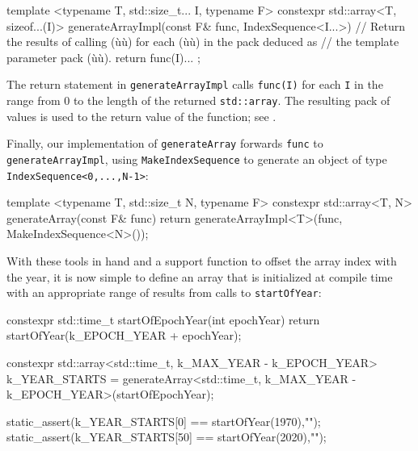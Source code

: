 \begin{emcppslisting}[emcppsbatch=e14]
template <typename T, std::size_t... I, typename F>
constexpr std::array<T, sizeof...(I)> generateArrayImpl(const F& func,
                                                        IndexSequence<I...>)
    // Return the results of calling (ù{}ù) for each (ù{}ù) in the pack deduced as
    // the template parameter pack (ù{}ù).
{
    return { func(I)... };
}
\end{emcppslisting}


\noindent The return statement in \lstinline!generateArrayImpl! calls
\lstinline!func(I)! for each \lstinline!I! in the range from 0 to the length
of the returned \lstinline!std::array!. The resulting pack of values is
used to  the return value of the function; see
.

Finally, our implementation of \lstinline!generateArray! forwards
\lstinline!func! to \lstinline!generateArrayImpl!, using
\lstinline!MakeIndexSequence! to generate an object of type
\lstinline!IndexSequence<0,...,N-1>!:

\begin{emcppslisting}[emcppsbatch=e14]
template <typename T, std::size_t N, typename F>
constexpr std::array<T, N> generateArray(const F& func)
{
    return generateArrayImpl<T>(func, MakeIndexSequence<N>());
}
\end{emcppslisting}


\noindent With these tools in hand and a support function to offset the array
index with the year, it is now simple to define an array that is
initialized at compile time with an appropriate range of results from
calls to \lstinline!startOfYear!:

\begin{emcppslisting}[emcppsbatch=e14]
constexpr std::time_t startOfEpochYear(int epochYear)
{
    return startOfYear(k_EPOCH_YEAR + epochYear);
}

constexpr std::array<std::time_t, k_MAX_YEAR - k_EPOCH_YEAR> k_YEAR_STARTS =
    generateArray<std::time_t, k_MAX_YEAR - k_EPOCH_YEAR>(startOfEpochYear);

static_assert(k_YEAR_STARTS[0]  == startOfYear(1970),"");
static_assert(k_YEAR_STARTS[50] == startOfYear(2020),"");
\end{emcppslisting}


